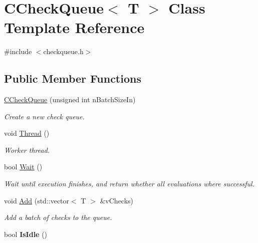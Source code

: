 \hypertarget{class_c_check_queue}{}\section{C\+Check\+Queue$<$ T $>$ Class Template Reference}
\label{class_c_check_queue}


{\ttfamily \#include $<$checkqueue.\+h$>$}

\subsection*{Public Member Functions}
\begin{DoxyCompactItemize}
\item 
\mbox{\label{class_c_check_queue_ad0e6a979f8433c05770350bc6b90a849}} 
\mbox{\hyperlink{class_c_check_queue_ad0e6a979f8433c05770350bc6b90a849}{C\+Check\+Queue}} (unsigned int n\+Batch\+Size\+In)
\begin{DoxyCompactList}\small\item\em Create a new check queue. \end{DoxyCompactList}\item 
\mbox{\label{class_c_check_queue_ad3602cd305b07612e634363b31c1d46c}} 
void \mbox{\hyperlink{class_c_check_queue_ad3602cd305b07612e634363b31c1d46c}{Thread}} ()
\begin{DoxyCompactList}\small\item\em Worker thread. \end{DoxyCompactList}\item 
\mbox{\label{class_c_check_queue_a4ff3e0e8241491efa1803eeb3a53e7fa}} 
bool \mbox{\hyperlink{class_c_check_queue_a4ff3e0e8241491efa1803eeb3a53e7fa}{Wait}} ()
\begin{DoxyCompactList}\small\item\em Wait until execution finishes, and return whether all evaluations where successful. \end{DoxyCompactList}\item 
\mbox{\label{class_c_check_queue_aee8e83bcdeef17740937e6c1dc84c478}} 
void \mbox{\hyperlink{class_c_check_queue_aee8e83bcdeef17740937e6c1dc84c478}{Add}} (std\+::vector$<$ T $>$ \&v\+Checks)
\begin{DoxyCompactList}\small\item\em Add a batch of checks to the queue. \end{DoxyCompactList}\item 
\mbox{\label{class_c_check_queue_a3c091928859b0936331341edeb977325}} 
bool {\bfseries Is\+Idle} ()
\end{DoxyCompactItemize}


